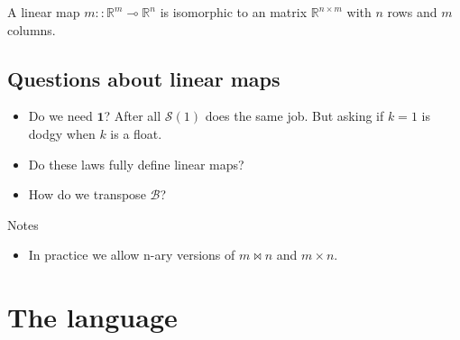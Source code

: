 \documentclass[sigplan,review]{acmart}
\newcommand{\linto}{\multimap}     %
\newcommand{\real}{\mathbb{R}}       %
\newcommand{\lmpair}{\times}         %
\newcommand{\lmjoin}{\bowtie}        %
\newcommand{\lmone}{\mathbf{1}}      %
\newcommand{\lmscalar}[1]{{\mathcal S}(#1)}      %
\newcommand{\lmbuild}{\mathcal B}             %
\begin{document}
A linear map $m :: \real^m \linto \real^n$ is isomorphic to an matrix $\real^{n \times m}$ with $n$ rows and $m$ columns.

\subsection{Questions about linear maps}

\begin{itemize}
\item Do we need $\lmone$? After all $\lmscalar{1}$ does the same job.  But asking if $k=1$ is dodgy when $k$ is a float.
\item Do these laws fully define linear maps?
\item How do we transpose $\lmbuild$?
\end{itemize}
Notes
\begin{itemize}
\item In practice we allow n-ary versions of $m \lmjoin n$ and $m \lmpair n$.
\end{itemize}

\section{The language}
\end{document}
